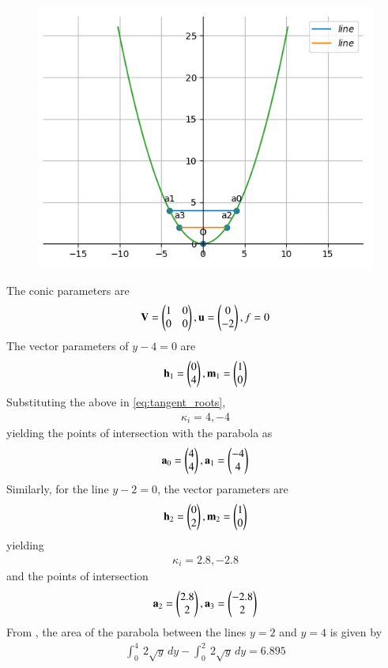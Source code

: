 	\begin{figure}[!h]
		\centering
 \includegraphics[width=\columnwidth]{chapters/12/8/3/3/figs/conic.png}
		\caption{}
		\label{fig:12/8/3/3}
  	\end{figure}
The conic parameters are
\begin{align}
	\mathbf{V} = \begin{pmatrix}1 & 0\\0 & 0\end{pmatrix},
	\mathbf{u} = \begin{pmatrix}0\\-2\end{pmatrix},
	f = 0
\end{align}
The vector parameters of 
$y-4=0$
are
\begin{align}
	\mathbf{h}_1=\begin{pmatrix}0\\4\end{pmatrix},
	\mathbf{m}_1=\begin{pmatrix}1\\0\end{pmatrix}
\end{align}
Substituting the above in \eqref{eq:tangent_roots},
\begin{align}
\kappa_i=4,-4
\end{align}
yielding
the points of intersection with the parabola as
\begin{align}
\mathbf{a}_0=\begin{pmatrix}4\\4\end{pmatrix},
\mathbf{a}_1=\begin{pmatrix}-4\\4\end{pmatrix}
\end{align}
Similarly, for 
the line $y-2=0$, the vector parameters are
\begin{align}
\mathbf{h}_2=\begin{pmatrix}0\\2\end{pmatrix},
\mathbf{m}_2=\begin{pmatrix}1\\0\end{pmatrix}
\end{align}
yielding 
\begin{align}
\kappa_i=2.8,-2.8
\end{align}
and the points of intersection
\begin{align}
\mathbf{a}_2=\begin{pmatrix}2.8\\2\end{pmatrix},
\mathbf{a}_3=\begin{pmatrix}-2.8\\2\end{pmatrix}
\end{align}
From 
		,
the area of the parabola between the lines $y=2$ and $y=4$ is given by
\begin{align}
\int_{0}^{4} \ 2\sqrt{y} \,dy-\int_{0}^{2} \ 2\sqrt{y} \,dy
=6.895 
\end{align}
